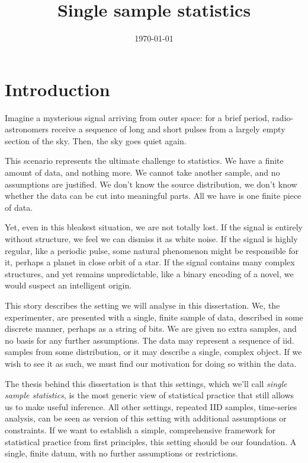 \documentclass{thesis}
\title{Single sample statistics}
\date{\today}
\begin{document}
\maketitle

\tableofcontents

\chapter{Introduction}

Imagine a mysterious signal arriving from outer space: for a brief period, radio-astronomers receive a sequence of long and short pulses from a largely empty section of the sky. Then, the sky goes quiet again.

This scenario represents the ultimate challenge to statistics. We have a finite amount of data, and nothing more. We cannot take another sample, and no assumptions are justified. We don't know the source distribution, we don't know whether the data can be cut into meaningful parts. All we have is one finite piece of data.

Yet, even in this bleakest situation, we are not totally lost. If the signal is entirely without structure, we feel we can dismiss it as white noise. If the signal is highly regular, like a periodic pulse, some natural phenomenon might be responsible for it, perhaps a planet in close orbit of a star. If the signal contains many complex structures, and yet remains unpredictable, like a binary encoding of a novel, we would suspect an intelligent origin.

This story describes the setting we will analyse in this dissertation. We, the experimenter, are presented with a single, finite sample of data, described in some discrete manner, perhaps as a string of bits. We are given no extra samples, and no basis for any further assumptions. The data may represent a sequence of iid. samples from some distribution, or it may describe a single, complex object. If we wish to see it as such, we must find our motivation for doing so within the data.   

The thesis behind this dissertation is that this settings, which we'll call \emph{single sample statistics}, is the most generic view of statistical practice that still allows us to make useful inference. All other settings, repeated IID samples, time-series analysis, can be seen as  version of this setting with additional assumptions or constraints. If we want to establish a simple, comprehensive framework for statistical practice from first principles, this setting should be our foundation. A single, finite datum, with no further assumptions or restrictions.
\end{document}

